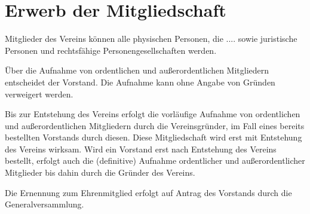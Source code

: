 \documentclass{article}
\begin{document}
\section{Erwerb der Mitgliedschaft}
\begin{absatz}
    \item Mitglieder des Vereins können alle physischen Personen, die
    ....
    sowie juristische Personen und rechtsfähige Personengesellschaften
    werden.
    \item Über die Aufnahme von ordentlichen und außerordentlichen Mitgliedern entscheidet der Vorstand. Die Aufnahme kann ohne Angabe von Gründen verweigert werden.
    \item Bis zur Entstehung des Vereins erfolgt die vorläufige Aufnahme von ordentlichen und außerordentlichen Mitgliedern durch die Vereinsgründer, im Fall eines bereits bestellten Vorstands durch diesen. Diese Mitgliedschaft wird erst mit Entstehung des Vereins wirksam. Wird ein Vorstand erst nach Entstehung des Vereins bestellt, erfolgt auch die (definitive) Aufnahme ordentlicher und außerordentlicher Mitglieder bis dahin durch die Gründer des Vereins.
    \item Die Ernennung zum Ehrenmitglied erfolgt auf Antrag des Vorstands durch die Generalversammlung.
\end{absatz}
\end{document}
